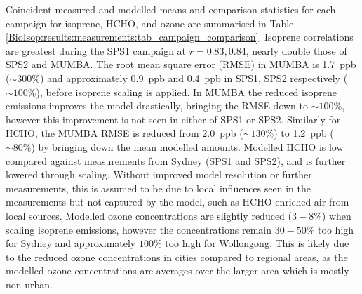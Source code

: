     
    
    
    
    Coincident measured and modelled means and comparison statistics for each campaign for isoprene, HCHO, and ozone are summarised in Table \ref{BioIsop:results:measurements:tab_campaign_comparison}.
    Isoprene correlations are greatest during the SPS1 campaign at $r=0.83,0.84$, nearly double those of SPS2 and MUMBA.
    The root mean square error (RMSE) in MUMBA is 1.7~ppb ($\sim 300\%$) and approximately 0.9~ppb and 0.4~ppb in SPS1, SPS2 respectively ($\sim 100\%$),  before isoprene scaling is applied.
    In MUMBA the reduced isoprene emissions improves the model drastically, bringing the RMSE down to $\sim{100}\%$, however this improvement is not seen in either of SPS1 or SPS2.
    Similarly for HCHO, the MUMBA RMSE is reduced from 2.0~ppb ($\sim{130}\%$) to 1.2~ppb ($\sim{80}\%$) by bringing down the mean modelled amounts.
    Modelled HCHO is low compared against measurements from Sydney (SPS1 and SPS2), and is further lowered through scaling.
    Without improved model resolution or further measurements, this is assumed to be due to local influences seen in the measurements but not captured by the model, such as HCHO enriched air from local sources.
    Modelled ozone concentrations are slightly reduced ($3-8\%$) when scaling isoprene emissions, however the concentrations remain $30-50\%$ too high for Sydney and approximately $100\%$ too high for Wollongong.
    This is likely due to the reduced ozone concentrations in cities compared to regional areas, as the modelled ozone concentrations are averages over the larger area which is mostly non-urban.
    
